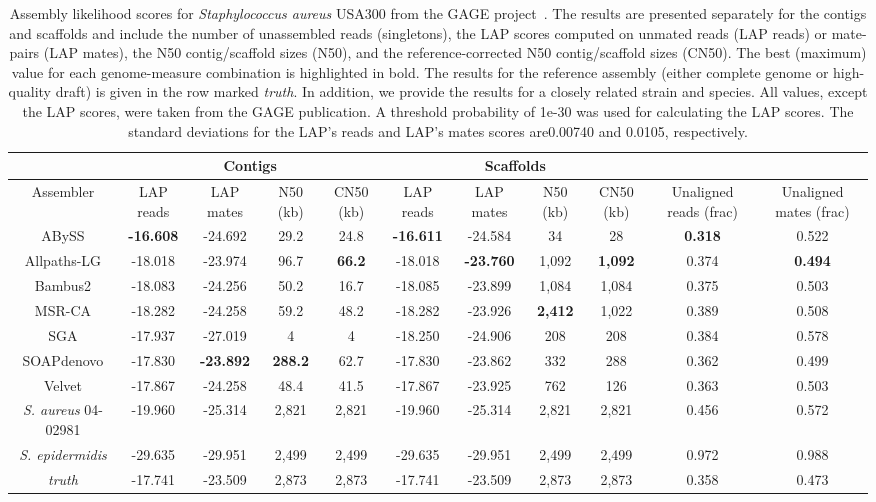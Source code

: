 \begin{landscape}
\renewcommand{\baselinestretch}{1}
\small\normalsize
\begin{table*}[tb!]
\centering
\tiny
\begin{tabular}{|c|c|c|c|c|c|c|c|c|c|c|}
\hline
 & \multicolumn{4}{c|}{Contigs} & \multicolumn{4}{c|}{Scaffolds} & &\\
\hline
Assembler & LAP reads & LAP mates & N50 (kb) & CN50 (kb) & LAP reads & LAP mates & N50 (kb) & CN50 (kb) & Unaligned reads (frac) & Unaligned mates (frac)\\
\hline
ABySS & {\bf -16.608} & -24.692 & 29.2 & 24.8 & {\bf -16.611} & -24.584 & 34 & 28 & {\bf 0.318} & 0.522\\
Allpaths-LG & -18.018 & -23.974 & 96.7 & {\bf 66.2} & -18.018 & {\bf -23.760} & 1,092 & {\bf 1,092} & 0.374 & {\bf 0.494}\\
Bambus2 & -18.083 & -24.256 & 50.2 & 16.7 & -18.085 & -23.899 & 1,084 & 1,084 & 0.375 & 0.503\\
MSR-CA & -18.282 & -24.258 & 59.2 & 48.2 & -18.282 & -23.926 & {\bf 2,412} & 1,022 & 0.389 & 0.508\\
SGA & -17.937 & -27.019 & 4 & 4 & -18.250 & -24.906 & 208 & 208 & 0.384 & 0.578\\
SOAPdenovo & -17.830 & {\bf -23.892} & {\bf 288.2} & 62.7 & -17.830 & -23.862 & 332 & 288 & 0.362 & 0.499\\
Velvet & -17.867 & -24.258 & 48.4 & 41.5 & -17.867 & -23.925 & 762 & 126 & 0.363 & 0.503\\
\emph{S. aureus} 04-02981 & -19.960 & -25.314 & 2,821 & 2,821 & -19.960 & -25.314 & 2,821 & 2,821 & 0.456 & 0.572\\
\emph{S. epidermidis} & -29.635 & -29.951 & 2,499 & 2,499 & -29.635 & -29.951 & 2,499 & 2,499 & 0.972 & 0.988\\
\emph{truth}  & -17.741 & -23.509 & 2,873 & 2,873 & -17.741 & -23.509 & 2,873 & 2,873 & 0.358 & 0.473\\
\hline
\end{tabular}
\caption[\emph{Staphylococcus aureus} USA300 assembly evaluation.]{Assembly likelihood scores for \emph{Staphylococcus
aureus} USA300 from the GAGE project~\cite{earl2011assemblathon}.
The results are presented
separately for the contigs and scaffolds and include the number of
unassembled reads (singletons), the LAP scores computed on unmated reads (LAP reads) or
mate-pairs (LAP mates), the N50 contig/scaffold sizes (N50),
and the reference-corrected N50 contig/scaffold sizes (CN50).
The best (maximum) value for each
genome-measure combination is highlighted in bold.
The results for the reference
assembly (either complete genome or high-quality draft) is given in the row
marked \emph{truth}.  In addition, we
provide the results for a closely related strain and species.
All values, except the LAP scores, were taken from the
GAGE publication. A threshold probability of 1e-30 was used for calculating the LAP scores. The standard deviations for the LAP's reads and LAP's mates scores are0.00740 and 0.0105, respectively.}
\label{tab:staph}
\end{table*}
\renewcommand{\baselinestretch}{2}
\small\normalsize
\end{landscape}

